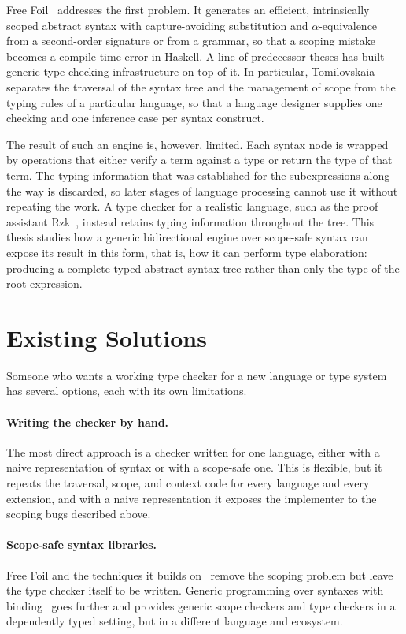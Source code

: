 Free Foil~\cite{kudasov2024freefoil,freefoil} addresses the first problem. It generates an efficient, intrinsically scoped abstract syntax with capture-avoiding substitution and $\alpha$-equivalence from a second-order signature or from a grammar, so that a scoping mistake becomes a compile-time error in Haskell. A line of predecessor theses has built generic type-checking infrastructure on top of it. In particular, Tomilovskaia~\cite{tomilovskaia2025bidir} separates the traversal of the syntax tree and the management of scope from the typing rules of a particular language, so that a language designer supplies one checking and one inference case per syntax construct.

The result of such an engine is, however, limited. Each syntax node is wrapped by operations that either verify a term against a type or return the type of that term. The typing information that was established for the subexpressions along the way is discarded, so later stages of language processing cannot use it without repeating the work. A type checker for a realistic language, such as the proof assistant Rzk~\cite{kudasov2026rzk}, instead retains typing information throughout the tree. This thesis studies how a generic bidirectional engine over scope-safe syntax can expose its result in this form, that is, how it can perform type elaboration: producing a complete typed abstract syntax tree rather than only the type of the root expression.

\section{Existing Solutions}
\label{sec:intro-existing}

Someone who wants a working type checker for a new language or type system has several options, each with its own limitations.

\paragraph{Writing the checker by hand.} The most direct approach is a checker written for one language, either with a naive representation of syntax or with a scope-safe one. This is flexible, but it repeats the traversal, scope, and context code for every language and every extension, and with a naive representation it exposes the implementer to the scoping bugs described above.

\paragraph{Scope-safe syntax libraries.} Free Foil and the techniques it builds on~\cite{kudasov2024freemonads,maclaurin2023foil} remove the scoping problem but leave the type checker itself to be written. Generic programming over syntaxes with binding~\cite{allais2021universe} goes further and provides generic scope checkers and type checkers in a dependently typed setting, but in a different language and ecosystem.

